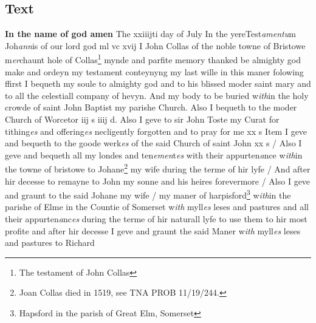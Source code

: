 \documentclass[a4paper,12pt]{article}
\begin{document}
\begin{landscape}\section*{Text}
\textbf{In the name of god amen} The xxiiijti day of July In the yere\hfill Test\textit{amentu}m Joh\textit{ann}is\newline 
of our lord god ml vc xvij I John Collas of the noble towne of Bristowe m\textit{er}chaunt hole of \hfill Collas\footnote{The testament of John Collas}\newline 
mynde and parfite memory thanked be almighty god make and ordeyn my testament\newline 
conteynyng my last wille in this maner folowing ffirst I bequeth my soule to almighty\newline 
god and to his blissed moder saint mary and to all the celestiall company of hevyn. And\newline 
my body to be buried w\textit{ith}in the holy crowde of saint John Baptist my parishe Church. Also\newline 
I bequeth to the moder Church of Worcetor iij s iiij d. Also I geve to sir John Toste my Curat\newline 
for tithing\textit{es} and offering\textit{es} necligently forgotten and to pray for me xx s Item I geve and\newline 
bequeth to the goode werk\textit{es} of the said Church of saint John xx s / Also I geve and bequeth\newline 
all my londes and ten\textit{emen}t\textit{es} with their appurten\textit{a}nce w\textit{ith}in the towne of bristowe to Johane\footnote{Joan Collas died in 1519, see TNA PROB 11/19/244.} my\newline 
wife during the terme of hir lyfe / And after hir decesse to remayne to John my sonne and\newline 
his heires forevermore / Also I geve and graunt to the said Johane my wife / my maner of\newline 
harpisford\footnote{Hapsford in the parish of Great Elm, Somerset} w\textit{ith}in the parishe of Elme in the Countie of Somerset w\textit{ith} myll\textit{es} leses and pastures\newline 
and all their appurten\textit{a}nc\textit{es} during the terme of hir naturall lyfe to use them to hir most profite\newline 
and after hir decesse I geve and graunt the said Maner w\textit{ith} myll\textit{es} leses and pastures to Richard\newline 

\end{landscape}
\end{document}
